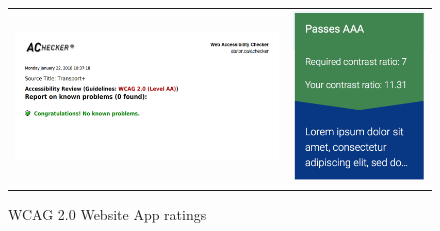 \documentclass{ueacmpstyle}
\begin{document}
{{\begin{figure}[H]
	\centering
	\begin{tabular}{ll}
				\includegraphics[trim=0cm 0cm 0cm 0cm, clip=true, totalheight=0.2\textheight, angle=0]{photos/access_rating.png}
		&
				\includegraphics[trim=0cm 0cm 0cm 0cm, clip=true, totalheight=0.2\textheight, angle=0]{photos/colour_rating.png}
	\end{tabular}
	\caption{WCAG 2.0 Website App ratings}
\end{figure}
	
}}
\end{document}
